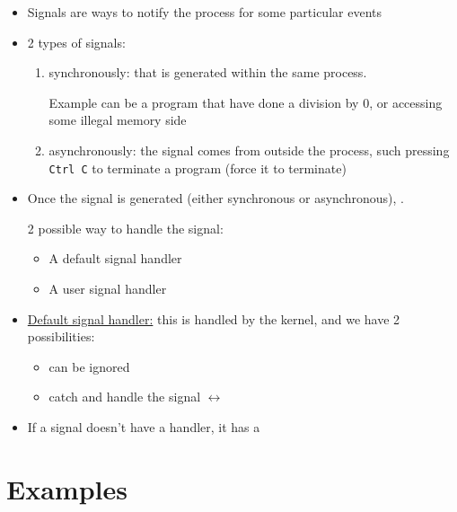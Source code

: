 \documentclass[12pt,a4paper]{book}
\begin{document}
\begin{itemize}

\item Signals are ways to notify the process for some particular events

\item 2 types of signals:

	\begin{enumerate}
	\item synchronously: that is generated within the same process.
	
	Example can be a program that have done a division by 0, or accessing some illegal memory side
	
	\item asynchronously: the signal comes from outside the process, such pressing \verb|Ctrl C| to terminate a program (force it to terminate)

	\end{enumerate}


\item Once the signal is generated (either synchronous or asynchronous), .

2 possible way to handle the signal:

	\begin{itemize}
	\item A default signal handler
	
	\item A user signal handler
	\end{itemize}


\item \underline{Default signal handler:} this is handled by the kernel, and we have 2 possibilities:

	\begin{itemize}
	\item can be ignored
	
	\item catch and handle the signal $\leftrightarrow$ 
	\end{itemize}

\item If a signal doesn't have a handler, it has a 

\end{itemize}

\newpage
\section{Examples}
\end{document}

